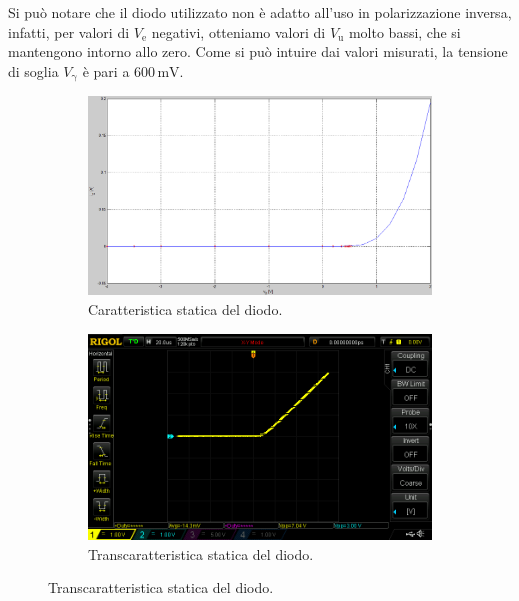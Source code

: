 \documentclass[a4paper]{article}
\begin{document}
				Si può notare che il diodo utilizzato non è adatto all'uso in polarizzazione inversa, infatti, per valori di $ V_{\mathrm{e}} $ negativi, otteniamo valori di $ V_{\mathrm{u}} $ molto bassi, che si mantengono intorno allo zero. Come si può intuire dai valori misurati, la tensione di soglia $ V_{\mathrm{\gamma}} $ è pari a $ 600 \, \mathrm{mV} $.
				\begin{figure}[h!]
					\centering
					\begin{subfigure}{0.5\textwidth}
						\centering
						\includegraphics[scale=0.2]{caratteristicheStaticheDiodoCaratteristica}
						\caption{Caratteristica statica del diodo.}
					\end{subfigure}
					\begin{subfigure}{0.3\textwidth}
						\centering
						\includegraphics[scale=0.2]{caratteristicheStaticheDiodoTranscaratteristica}
						\caption{Transcaratteristica statica del diodo.}
					\end{subfigure}
					\label{fig:caratteristicheStaticheDiodo}
				\end{figure}
\end{document}
